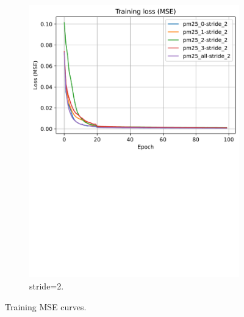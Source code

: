 \begin{figure}[!htbp]
\begin{subfigure}[!htbp]{.45\textwidth}
        \includegraphics[width=\textwidth]{fig/results/train_curves_stride_2.pdf}
        \caption{stride=2.}
        \label{fig:train_stride_2}
    \end{subfigure}
\caption{Training MSE curves.}
\label{fig:training_mse}
\end{figure}

